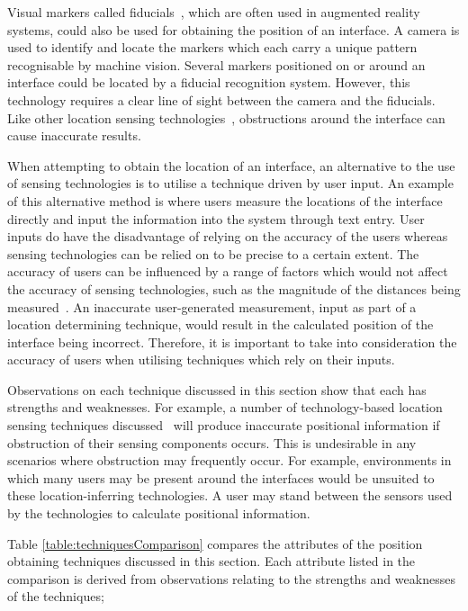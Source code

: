 \documentclass{bmcart}
\begin{document}
Visual markers called fiducials~\cite{Sagitov2017}, which are often used in augmented reality systems, could also be used for obtaining the position of an interface.
A camera is used to identify and locate the markers which each carry a unique pattern recognisable by machine vision.
Several markers positioned on or around an interface could be located by a fiducial recognition system.
However, this technology requires a clear line of sight between the camera and the fiducials.
Like other location sensing technologies~\cite{Smith2013,Kortuem2005,Ma2017}, obstructions around the interface can cause inaccurate results.

When attempting to obtain the location of an interface, an alternative to the use of sensing technologies is to utilise a technique driven by user input.
An example of this alternative method is where users measure the locations of the interface directly and input the information into the system through text entry. 
User inputs do have the disadvantage of relying on the accuracy of the users whereas sensing technologies can be relied on to be precise to a certain extent.
The accuracy of users can be influenced by a range of factors which would not affect the accuracy of sensing technologies, such as the magnitude of the distances being measured~\cite{Al-Imam2006}.
An inaccurate user-generated measurement, input as part of a location determining technique, would result in the calculated position of the interface being incorrect.
Therefore, it is important to take into consideration the accuracy of users when utilising techniques which rely on their inputs.

Observations on each technique discussed in this section show that each has strengths and weaknesses.
For example, a number of technology-based location sensing techniques discussed~\cite{Sagitov2017,Smith2013,Kortuem2005,Ma2017} will produce inaccurate positional information if obstruction of their sensing components occurs.
This is undesirable in any scenarios where obstruction may frequently occur.
For example, environments in which many users may be present around the interfaces would be unsuited to these location-inferring technologies.
A user may stand between the sensors used by the technologies to calculate positional information.


Table \ref{table:techniquesComparison} compares the attributes of the position obtaining techniques discussed in this section.
Each attribute listed in the comparison is derived from observations relating to the strengths and weaknesses of the techniques;
\end{document}
